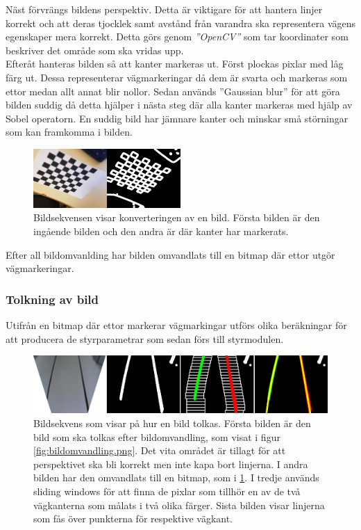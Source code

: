 \documentclass[10pt,oneside,swedish]{lips}
\begin{document}
\noindent
Näst förvrängs bildens perspektiv. Detta är viktigare för att hantera linjer korrekt och att deras tjocklek samt avstånd från varandra ska representera vägens egenskaper mera korrekt. Detta görs genom \emph{''OpenCV''} som tar koordinater som beskriver det område som ska vridas upp.\\

\noindent
Efteråt hanteras bilden så att kanter markeras ut. Först plockas pixlar med låg färg ut. Dessa representerar vägmarkeringar då dem är svarta och markeras som ettor medan allt annat blir nollor. Sedan används ''Gaussian blur'' för att göra bilden suddig då detta hjälper i nästa steg där alla kanter markeras med hjälp av Sobel operatorn. En suddig bild har jämnare kanter och minskar små störningar som kan framkomma i bilden.\\

\begin{figure}[htbp]
  \centering
  \includegraphics[width=0.5\textwidth]{./Figures/tekdok-edgemarking.png}
  \caption{Bildsekvensen visar konverteringen av en bild. Första bilden är den ingående bilden och den andra är där kanter har markerats.}
  \label{fig:kantmarkering}
\end{figure}

\noindent
Efter all bildomvanlding har bilden omvandlats till en bitmap där ettor utgör vägmarkeringar.

\subsubsection{Tolkning av bild}

Utifrån en bitmap där ettor markerar vägmarkingar utförs olika beräkningar för att producera de styrparametrar som sedan förs till styrmodulen. \\

\begin{figure}[htbp]
  \centering
  \includegraphics[width=1\textwidth]{./Figures/tekdok-linedetection.png}
  \caption{Bildsekvens som visar på hur en bild tolkas. Första bilden är den bild som ska tolkas efter bildomvandling, som visat i figur \ref{fig:bildomvandling.png}. Det vita området är tillagt för att perspektivet ska bli korrekt men inte kapa bort linjerna. I andra bilden har den omvandlats till en bitmap, som i \ref{fig:kantmarkering}. I tredje används sliding windows för att finna de pixlar som tillhör en av de två vägkanterna som målats i två olika färger. Sista bilden visar linjerna som fås över punkterna för respektive vägkant. }
  \label{fig:bildtolkning.png}
\end{figure}
\end{document}
